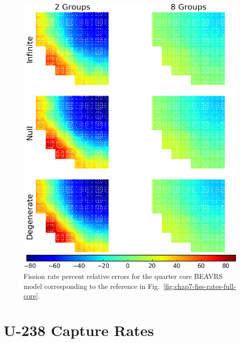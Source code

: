 \begin{appendices}
\begin{figure}[h!]
\centering
\includegraphics[width=\linewidth]{figures/quantification/appendix/full-core/fiss-err}
\vspace{2mm}
\caption[Fission rate errors for the 2D quarter core \ac{BEAVRS} model]{Fission rate percent relative errors for the quarter core \ac{BEAVRS} model corresponding to the reference in Fig.~\ref{fig:chap7-fiss-rates-full-core}.}
\label{fig:quantify-full-core-fiss-err}
\end{figure}

\clearpage


\section{U-238 Capture Rates}
\label{sec:quantify-capt-rates}


\end{appendices}
